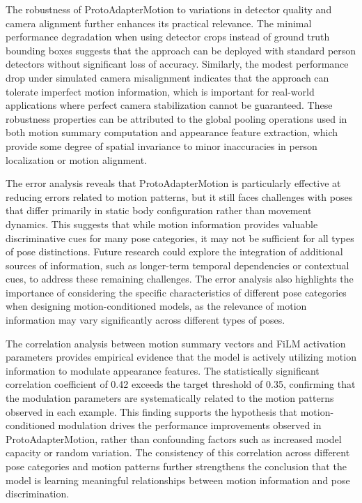 \documentclass[11pt]{article}
\begin{document}
The robustness of ProtoAdapterMotion to variations in detector quality and camera alignment further enhances its practical relevance. The minimal performance degradation when using detector crops instead of ground truth bounding boxes suggests that the approach can be deployed with standard person detectors without significant loss of accuracy. Similarly, the modest performance drop under simulated camera misalignment indicates that the approach can tolerate imperfect motion information, which is important for real-world applications where perfect camera stabilization cannot be guaranteed. These robustness properties can be attributed to the global pooling operations used in both motion summary computation and appearance feature extraction, which provide some degree of spatial invariance to minor inaccuracies in person localization or motion alignment.

The error analysis reveals that ProtoAdapterMotion is particularly effective at reducing errors related to motion patterns, but it still faces challenges with poses that differ primarily in static body configuration rather than movement dynamics. This suggests that while motion information provides valuable discriminative cues for many pose categories, it may not be sufficient for all types of pose distinctions. Future research could explore the integration of additional sources of information, such as longer-term temporal dependencies or contextual cues, to address these remaining challenges. The error analysis also highlights the importance of considering the specific characteristics of different pose categories when designing motion-conditioned models, as the relevance of motion information may vary significantly across different types of poses.

The correlation analysis between motion summary vectors and FiLM activation parameters provides empirical evidence that the model is actively utilizing motion information to modulate appearance features. The statistically significant correlation coefficient of 0.42 exceeds the target threshold of 0.35, confirming that the modulation parameters are systematically related to the motion patterns observed in each example. This finding supports the hypothesis that motion-conditioned modulation drives the performance improvements observed in ProtoAdapterMotion, rather than confounding factors such as increased model capacity or random variation. The consistency of this correlation across different pose categories and motion patterns further strengthens the conclusion that the model is learning meaningful relationships between motion information and pose discrimination.
\end{document}
